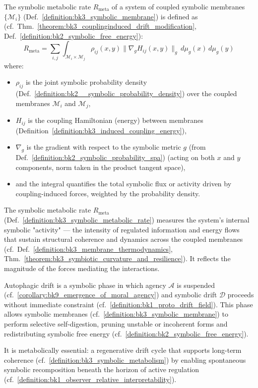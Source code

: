 \begin{definition} \label{definition:bk3_symbolic_metabolic_rate}
The symbolic metabolic rate $R_{\text{meta}}$ of a system of coupled symbolic membranes $\{\mathcal{M}_i\}$ (Def.~\ref{definition:bk3_symbolic_membrane}) is defined as (cf.~Thm.~\ref{theorem:bk3_couplinginduced_drift_modification}, Def.~\ref{definition:bk2_symbolic_free_energy}):
\[
R_{\text{meta}} = \sum_{i,j} \int_{\mathcal{M}_i \times \mathcal{M}_j} \rho_{ij}(x,y) \|\nabla_g H_{ij}(x,y)\|_g \, d\mu_g(x) \, d\mu_g(y)
\]
where:
\begin{itemize}
    \item $\rho_{ij}$ is the joint symbolic probability density (Def.~\ref{definition:bk2__symbolic_probability_density}) over the coupled membranes $\mathcal{M}_i$ and $\mathcal{M}_j$,
    \item $H_{ij}$ is the coupling Hamiltonian (energy) between membranes (Definition~\ref{definition:bk3_induced_coupling_energy}),
    \item $\nabla_g$ is the gradient with respect to the symbolic metric $g$ (from Def.~\ref{definition:bk2_symbolic_probability_spa}) (acting on both $x$ and $y$ components, norm taken in the product tangent space),
    \item and the integral quantifies the total symbolic flux or activity driven by coupling-induced forces, weighted by the probability density.
\end{itemize}
\end{definition}

\begin{remark} \label{remark:bk3_symbolic_membrane_remark}
The symbolic metabolic rate $R_{\text{meta}}$ (Def.~\ref{definition:bk3_symbolic_metabolic_rate}) measures the system's internal symbolic "activity" — the intensity of regulated information and energy flows that sustain structural coherence and dynamics across the coupled membranes (cf.~Def.~\ref{definition:bk3_membrane_thermodynamics}, Thm.~\ref{theorem:bk3_symbiotic_curvature_and_resilience}). It reflects the magnitude of the forces mediating the interactions.
\end{remark}

\begin{definition} \label{definition:bk3_autophagic_drift}
Autophagic drift is a symbolic phase in which agency $\mathcal{A}$ is suspended (cf.~\ref{corollary:bk9_emergence_of_moral_agency}) 
and symbolic drift $\mathcal{D}$ proceeds without immediate constraint (cf.~\ref{definition:bk1_proto_drift_field}). 
This phase allows symbolic membranes (cf.~\ref{definition:bk3_symbolic_membrane}) 
to perform selective self-digestion, pruning unstable or incoherent forms and redistributing symbolic free energy (cf.~\ref{definition:bk2_symbolic_free_energy}).

It is metabolically essential: a regenerative drift cycle that supports long-term coherence (cf.~\ref{definition:bk3_symbolic_metabolism}) 
by enabling spontaneous symbolic recomposition beneath the horizon of active regulation (cf.~\ref{definition:bk1_observer_relative_interpretability}).
\end{definition}


